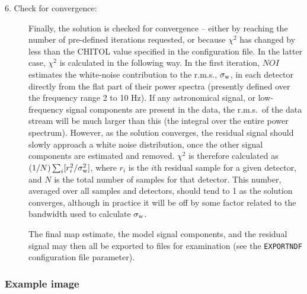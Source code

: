 \documentclass[twoside,11pt]{article}
\renewcommand{\_}{\texttt{\symbol{95}}}
\newcommand{\cparam}[1]{\texttt{#1}}     %
\begin{document}
\begin{description}
\item[6. Check for convergence:] Finally, the solution is checked for
  convergence -- either by reaching the number of pre-defined
  iterations requested, or because $\chi^2$ has changed by less than
  the CHITOL value specified in the configuration file. In the latter
  case, $\chi^2$ is calculated in the following way. In the first
  iteration, $NOI$ estimates the white-noise contribution to the
  r.m.s., $\sigma_{\rm w}$, in each detector directly from the flat
  part of their power spectra (presently defined over the frequency
  range 2 to 10 Hz). If any astronomical signal, or low-frequency
  signal components are present in the data, the r.m.s.\ of the data
  stream will be much larger than this (the integral over the entire
  power spectrum). However, as the solution converges, the residual
  signal should slowly approach a white noise distribution, once the
  other signal components are estimated and removed. $\chi^2$ is
  therefore calculated as $(1/N) \sum_i[ r_i^2/\sigma^2_{\rm w}]$,
  where $r_i$ is the $i$th residual sample for a given detector, and
  $N$ is the total number of samples for that detector. This number,
  averaged over all samples and detectors, should tend to 1 as the
  solution converges, although in practice it will be off by some
  factor related to the bandwidth used to calculate $\sigma_{\rm w}$.

  The final map estimate, the model signal components, and the
  residual signal may then all be exported to files for examination
  (see the \cparam{EXPORTNDF} configuration file parameter).

\end{description}

\subsubsection{Example image}
\end{document}
